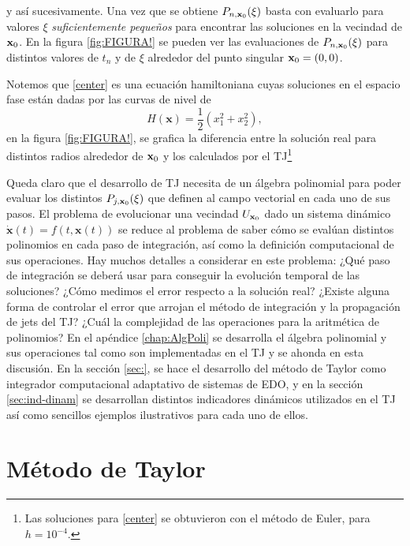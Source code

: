 y así sucesivamente. Una vez que se obtiene $P_{n,\mathbf{x}_0}(\xi)$ basta con evaluarlo para valores $\mathbb{\xi}$ \textit{suficientemente pequeños} para encontrar las soluciones en la vecindad de $\mathbf{x}_0$. En la figura \ref{fig:FIGURA!} se pueden ver las evaluaciones de $P_{n,\mathbf{x}_0}(\xi)$ para distintos valores de $t_n$ y de $\xi$ alrededor del punto singular $\mathbf{x}_0 = (0,0)$.


Notemos que \ref{center} es una ecuación hamiltoniana cuyas soluciones en el espacio fase están dadas por las curvas de nivel de
\begin{equation*}
H(\mathbf{x}) = \frac{1}{2} \left( x_1^2 + x_2^2 \right),
\end{equation*} 
en la figura \ref{fig:FIGURA!}, se grafica la diferencia entre la solución real para distintos radios alrededor de $\mathbf{x}_0$ y los calculados por el TJ\footnote{Las soluciones para \ref{center} se obtuvieron con el método de Euler, para $h=10^{-4}$.}


Queda claro que el desarrollo de TJ necesita de un álgebra polinomial para poder evaluar los distintos $P_{j,\mathbf{x}_0}(\xi)$ que definen al campo vectorial en cada uno de sus pasos. El problema de evolucionar una vecindad $U_{\mathbf{x}_0}$ dado un sistema dinámico $\dot{\mathbf{x}}(t) = f(t,\mathbf{x}(t))$ se reduce al problema de saber cómo se evalúan distintos polinomios en cada paso de integración, así como la definición computacional de sus operaciones. Hay muchos detalles a considerar en este problema: ¿Qué paso de integración se deberá usar para conseguir la evolución temporal de las soluciones? ¿Cómo medimos el error respecto a la solución real? ¿Existe alguna forma de controlar el error que arrojan el método de integración y la propagación de jets del TJ? ¿Cuál la complejidad de las operaciones para la aritmética de polinomios? En el apéndice \ref{chap:AlgPoli} se desarrolla el álgebra polinomial y sus operaciones tal como son implementadas en el TJ y se ahonda en esta discusión. En la sección \ref{sec:}, se hace el desarrollo del método de Taylor como integrador computacional adaptativo de sistemas de EDO, y en la sección \ref{sec:ind-dinam} se desarrollan distintos indicadores dinámicos utilizados en el TJ así como sencillos ejemplos ilustrativos para cada uno de ellos.

\section{Método de Taylor}

